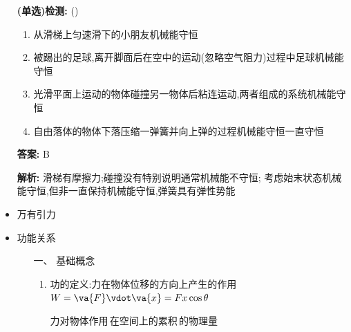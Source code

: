 \documentclass{article}
\begin{document}
\begin{itemize}
        \vspace{1em}

        \item[] \textbf{(单选)检测:} (\qquad)
        
        \begin{enumerate}[label=\Alph*.]
            \item 从滑梯上匀速滑下的小朋友机械能守恒
            \item 被踢出的足球,离开脚面后在空中的运动(忽略空气阻力)过程中足球机械能守恒
            \item 光滑平面上运动的物体碰撞另一物体后粘连运动,两者组成的系统机械能守恒
            \item 自由落体的物体下落压缩一弹簧并向上弹的过程机械能守恒一直守恒
        \end{enumerate}

        \textbf{答案:} B

        \textbf{解析:} 滑梯有摩擦力;碰撞没有特别说明通常机械能不守恒;
        考虑始末状态机械能守恒,但非一直保持机械能守恒,弹簧具有弹性势能
        
        \hspace{2em}

    \item 万有引力
    
            
    \hspace{2em}

    \item 功能关系
        \begin{enumerate}
            \item[一、] 基础概念
            \begin{enumerate}
                \item 功的定义:力在物体位移的方向上产生的作用$ W = \va{F} \vdot \va{x} = Fx\cos{\theta}$
                
                \vspace{-1em}

                \hspace{-1em}\begin{adjustbox}{minipage=0.37\linewidth, bgcolor=gray!20, padding=1em}
                    \small %
                    力对物体作用\,在空间上的累积\,的物理量
                \end{adjustbox}

                \vspace{-1em}


\end{enumerate}
\end{enumerate}
\end{itemize}
\end{document}
